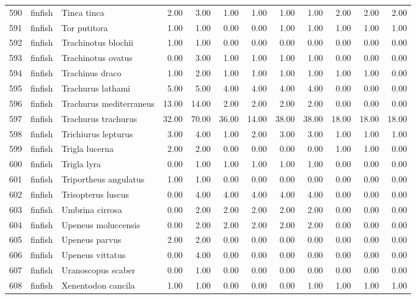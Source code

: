 \begin{table}[ht]
\begin{tabular}{rllrrrrrrrrr}
  590 & finfish & Tinca tinca & 2.00 & 3.00 & 1.00 & 1.00 & 1.00 & 1.00 & 2.00 & 2.00 & 2.00 \\ 
  591 & finfish & Tor putitora & 1.00 & 1.00 & 0.00 & 0.00 & 1.00 & 1.00 & 1.00 & 1.00 & 1.00 \\ 
  592 & finfish & Trachinotus blochii & 1.00 & 1.00 & 0.00 & 0.00 & 0.00 & 0.00 & 0.00 & 0.00 & 0.00 \\ 
  593 & finfish & Trachinotus ovatus & 0.00 & 3.00 & 1.00 & 1.00 & 1.00 & 1.00 & 0.00 & 0.00 & 0.00 \\ 
  594 & finfish & Trachinus draco & 1.00 & 2.00 & 1.00 & 1.00 & 1.00 & 1.00 & 1.00 & 1.00 & 0.00 \\ 
  595 & finfish & Trachurus lathami & 5.00 & 5.00 & 4.00 & 4.00 & 4.00 & 4.00 & 0.00 & 0.00 & 0.00 \\ 
  596 & finfish & Trachurus mediterraneus & 13.00 & 14.00 & 2.00 & 2.00 & 2.00 & 2.00 & 0.00 & 0.00 & 0.00 \\ 
  597 & finfish & Trachurus trachurus & 32.00 & 70.00 & 36.00 & 14.00 & 38.00 & 38.00 & 18.00 & 18.00 & 18.00 \\ 
  598 & finfish & Trichiurus lepturus & 3.00 & 4.00 & 1.00 & 2.00 & 3.00 & 3.00 & 1.00 & 1.00 & 1.00 \\ 
  599 & finfish & Trigla lucerna & 2.00 & 2.00 & 0.00 & 0.00 & 0.00 & 0.00 & 1.00 & 1.00 & 0.00 \\ 
  600 & finfish & Trigla lyra & 0.00 & 1.00 & 1.00 & 1.00 & 1.00 & 1.00 & 0.00 & 0.00 & 0.00 \\ 
  601 & finfish & Triportheus angulatus & 1.00 & 1.00 & 0.00 & 0.00 & 0.00 & 0.00 & 0.00 & 0.00 & 0.00 \\ 
  602 & finfish & Trisopterus luscus & 0.00 & 4.00 & 4.00 & 4.00 & 4.00 & 4.00 & 0.00 & 0.00 & 0.00 \\ 
  603 & finfish & Umbrina cirrosa & 0.00 & 2.00 & 2.00 & 2.00 & 2.00 & 2.00 & 0.00 & 0.00 & 0.00 \\ 
  604 & finfish & Upeneus moluccensis & 0.00 & 2.00 & 2.00 & 2.00 & 2.00 & 2.00 & 0.00 & 0.00 & 0.00 \\ 
  605 & finfish & Upeneus parvus & 2.00 & 2.00 & 0.00 & 0.00 & 0.00 & 0.00 & 0.00 & 0.00 & 0.00 \\ 
  606 & finfish & Upeneus vittatus & 0.00 & 4.00 & 0.00 & 0.00 & 0.00 & 0.00 & 0.00 & 0.00 & 0.00 \\ 
  607 & finfish & Uranoscopus scaber & 0.00 & 1.00 & 0.00 & 0.00 & 0.00 & 0.00 & 0.00 & 0.00 & 0.00 \\ 
  608 & finfish & Xenentodon cancila & 1.00 & 1.00 & 0.00 & 0.00 & 0.00 & 1.00 & 1.00 & 1.00 & 1.00 \\ 

\end{tabular}
\end{table}
